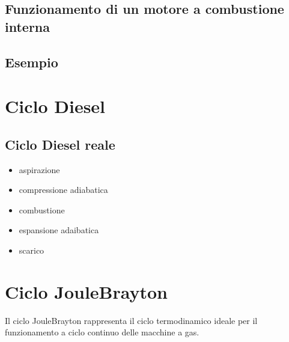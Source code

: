 \documentclass[letterpaper,10pt,italian]{jupyterBook}
\begin{document}
\subsection{Funzionamento di un motore a combustione interna}
\label{\detokenize{ch/thermodynamics/heat-engine-otto:funzionamento-di-un-motore-a-combustione-interna}}
\sphinxAtStartPar
{}


\subsection{Esempio}
\label{\detokenize{ch/thermodynamics/heat-engine-otto:esempio}}
\sphinxAtStartPar
{}

\sphinxstepscope


\section{Ciclo Diesel}
\label{\detokenize{ch/thermodynamics/heat-engine-diesel:ciclo-diesel}}\label{\detokenize{ch/thermodynamics/heat-engine-diesel:physics-hs-thermodynamics-heat-engine-diesel}}\label{\detokenize{ch/thermodynamics/heat-engine-diesel::doc}}

\subsection{Ciclo Diesel reale}
\label{\detokenize{ch/thermodynamics/heat-engine-diesel:ciclo-diesel-reale}}\begin{itemize}
\item {} 
\sphinxAtStartPar
aspirazione

\item {} 
\sphinxAtStartPar
compressione adiabatica

\item {} 
\sphinxAtStartPar
combustione

\item {} 
\sphinxAtStartPar
espansione adaibatica

\item {} 
\sphinxAtStartPar
scarico

\end{itemize}

\sphinxstepscope


\section{Ciclo Joule\sphinxhyphen{}Brayton}
\label{\detokenize{ch/thermodynamics/heat-engine-joule-brayton:ciclo-joule-brayton}}\label{\detokenize{ch/thermodynamics/heat-engine-joule-brayton:physics-hs-thermodynamics-heat-engine-joule-brayton}}\label{\detokenize{ch/thermodynamics/heat-engine-joule-brayton::doc}}
\sphinxAtStartPar
{}
Il ciclo Joule\sphinxhyphen{}Brayton rappresenta il ciclo termodinamico ideale per il funzionamento a ciclo continuo delle macchine a gas.
\end{document}
